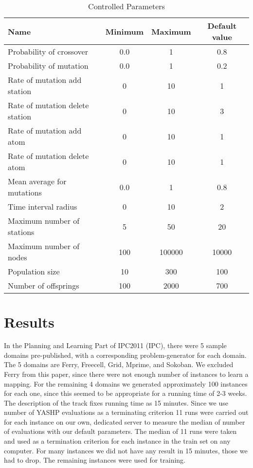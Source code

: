 \documentclass{acm_proc_article-sp}
\begin{document}
\begin{table*}[ht]
\centering
\begin{tabular}{l c c c}
\hline\hline
Name & Minimum & Maximum & Default value \\ 
\hline
Probability of crossover & 0.0 & 1 & 0.8 \\
Probability of mutation & 0.0& 1& 0.2 \\
Rate of mutation add station& 0& 10& 1 \\
Rate of mutation delete station& 0& 10& 3 \\
Rate of mutation add atom& 0& 10& 1 \\
Rate of mutation delete atom& 0& 10& 1 \\
Mean average for mutations& 0.0& 1& 0.8 \\
Time interval radius& 0& 10& 2 \\
Maximum number of stations& 5& 50& 20 \\
Maximum number of nodes& 100& 100000& 10000 \\
Population size& 10& 300& 100 \\
Number of offsprings& 100& 2000& 700 \\
\hline
\end{tabular}
\caption{Controlled Parameters}
\label{table:parameters}
\end{table*} 

\section{Results}
\label{section:results}

In the Planning and Learning Part of IPC2011 (IPC), there were 5 sample domains pre-published, with a corresponding problem-generator for each domain. The 5 domains are Ferry, Freecell, Grid, Mprime, and Sokoban. We excluded Ferry from this paper, since there were not enough number of instances to learn a mapping. For the remaining 4 domains we generated approximately 100 instances for each one, since this seemed to be appropriate for a running time of 2-3 weeks. The description of the track fixes running time as 15 minutes. Since we use number of YASHP evaluations as a terminating criterion 11 runs were carried out for each instance on our own, dedicated server to measure the median of number of evaluations with our default parameters. The median of 11 runs were taken and used as a termination criterion for each instance in the train set on any computer. For many instances we did not have any result in 15 minutes, those we had to drop. The remaining instances were used for training. 
\end{document}
